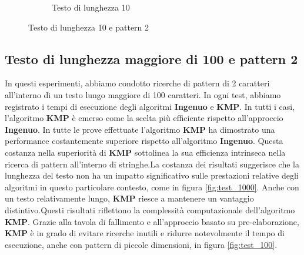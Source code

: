 \begin{figure}[H]
\begin{subfigure}[b]{0.49\textwidth}
        \caption{Testo di lunghezza 10}
        \label{fig:lunghezza10}
    \end{subfigure}
    \caption{Testo di lunghezza 10 e pattern 2}
    \label{fig:lunghezza10_12}
\end{figure}

\subsection{Testo di lunghezza maggiore di 100 e pattern 2}
In questi esperimenti, abbiamo condotto ricerche di pattern di 2 caratteri all'interno di un testo lungo maggiore di 100 caratteri. In ogni test, abbiamo registrato i tempi di esecuzione degli algoritmi \textbf{Ingenuo} e \textbf{KMP}. In tutti i casi, l'algoritmo \textbf{KMP} è emerso come la scelta più efficiente rispetto all'approccio \textbf{Ingenuo}. In tutte le prove effettuate  l'algoritmo \textbf{KMP} ha dimostrato una performance costantemente superiore rispetto all'algoritmo \textbf{Ingenuo}. Questa costanza nella superiorità di \textbf{KMP} sottolinea la sua efficienza intrinseca nella ricerca di pattern all'interno di stringhe.La costanza dei risultati suggerisce che la lunghezza del testo non ha un impatto significativo sulle prestazioni relative degli algoritmi in questo particolare contesto, come in figura \ref{fig:test_1000}. Anche con un testo relativamente lungo, \textbf{KMP} riesce a mantenere un vantaggio distintivo.Questi risultati riflettono la complessità computazionale dell'algoritmo \textbf{KMP}. Grazie alla tavola di fallimento e all'approccio basato su pre-elaborazione, \textbf{KMP} è in grado di evitare ricerche inutili e ridurre notevolmente il tempo di esecuzione, anche con pattern di piccole dimensioni, in figura \ref{fig:test_100}.
